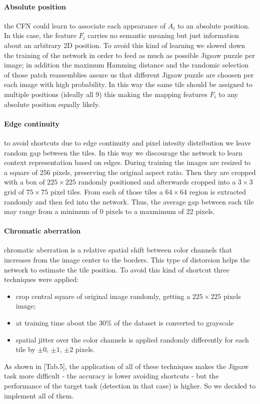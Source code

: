 \paragraph{Absolute position}
the CFN could learn to associate each appearance of $A_i$ to an absolute position. In this case, the feature $F_i$ carries no semantic meaning but just information about an arbitrary 2D position. To avoid this kind of learning we slowed down the training of the network in order to feed as much as possible Jigsaw puzzle per image; in addition the maximum Hamming distance and the randomic selection of those patch reassemblies assure us that different Jigsaw puzzle are choosen per each image with high probability. In this way the same tile should be assigned to multiple positions (ideally all 9) this making the mapping features $F_i$ to any absolute position equally likely.

\paragraph{Edge continuity}\label{p:edge_continuity}
to avoid shortcuts due to edge continuity and pixel intesity distribution we leave random gap between the tiles. In this way we discourage the network to learn context representation based on edges. During training the images are resized to a square of 256 pixels, preserving the original aspect ratio. Then they are cropped with a box of $225 \times 225$ randomly positioned and afterwards cropped into a $3 \times 3$ grid of $75 \times 75$ pixel tiles. From each of those tiles a $64 \times 64$ region is extracted randomly and then fed into the network. Thus, the average gap between each tile may range from a minimum of 0 pixels to a maxmimum of 22 pixels.

\paragraph{Chromatic aberration}\label{p:chromatic_aberration}
chromatic aberration is a relative spatial shift between color channels that increases from the image center to the borders. This type of distorsion helps the network to estimate the tile position. To avoid this kind of shortcut three techniques were applied:
\begin{itemize}
    \item crop central square of original image randomly, getting a $225 \times 225$ pixels image;
    \item at training time about the 30\% of the dataset is converted to grayscale
    \item spatial jitter over the color channels is applied randomly differently for each tile by $\pm0$, $\pm1$, $\pm2$ pixels. 
\end{itemize}
As shown in \cite{Noroozi_2016}[Tab.5], the application of all of these techniques makes the Jigsaw task more difficult - the accuracy is lower avoiding shortcuts - but the performance of the target task (detection in that case) is higher. So we decided to implement all of them.

